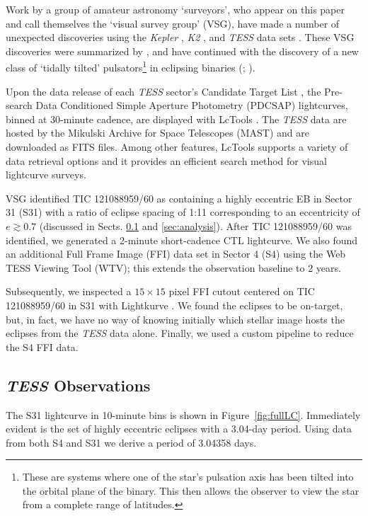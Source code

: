 \documentclass[fleqn,usenatbib]{mnras} %
\begin{document}
Work by a group of amateur astronomy `surveyors', who appear on this paper and call themselves the `visual survey group' (VSG), have made a number of unexpected discoveries using the {\em Kepler} \citep{Borucki2010}, {\em K2} \citep{Howell2014}, and {\em TESS} data sets \citep{Ricker2015}.  These VSG discoveries were summarized by \citet{Rappaport2019}, and have continued with the discovery of a new class of `tidally tilted' pulsators\footnote{These are systems where one of the star's pulsation axis has been tilted into the orbital plane of the binary.  This then allows the observer to view the star from a complete range of latitudes.} in eclipsing binaries (\citealt{Handler2020}; \citealt{Kurtz2020}).

Upon the data release of each {\em TESS} sector's Candidate Target List \citep[CTL,][]{Stassun2018}, the Pre-search Data Conditioned Simple Aperture Photometry (PDCSAP) lightcurves, binned at 30-minute cadence, are displayed with {\sc LcTools} \citep{Schmitt2019}. The {\em TESS} data are hosted by the Mikulski Archive for Space Telescopes (MAST) and are downloaded as FITS files.  Among other features, {\sc LcTools} supports a variety of data retrieval options and it provides an efficient search method for visual lightcurve surveys.

VSG identified TIC 121088959/60 as containing a highly eccentric EB in Sector 31 (S31) with a ratio of eclipse spacing of 1:11 corresponding to an eccentricity of $e \gtrsim 0.7$ (discussed in Sects. \ref{sec:tess} and \ref{sec:analysis}). After TIC 121088959/60 was identified, we generated a 2-minute short-cadence CTL lightcurve. We also found an additional Full Frame Image (FFI) data set in Sector 4 (S4) using the Web TESS Viewing Tool (WTV); this extends the observation baseline to 2 years.

Subsequently, we inspected a $15 \times 15$ pixel FFI cutout centered on TIC 121088959/60 in S31 with Lightkurve \citep{LKC}. We found the eclipses to be on-target, but, in fact, we have no way of knowing initially which stellar image hosts the eclipses from the {\em TESS} data alone. Finally, we used a custom pipeline to reduce the S4 FFI data.

\subsection{{\em TESS} Observations}
\label{sec:tess}
\indent The S31 lightcurve in 10-minute bins is shown in Figure~\ref{fig:fullLC}. Immediately evident is the set of highly eccentric eclipses with a 3.04-day period.  Using data from both S4 and S31 we derive a period of 3.04358 days.
\end{document}
